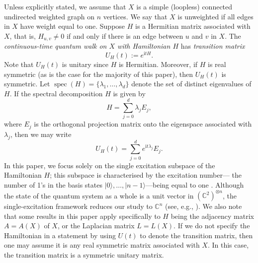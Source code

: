 \documentclass{article}
\numberwithin{equation}{section}
\def\C{\mathbb{C}}
\def\ii{\mathrm{i}}
\begin{document}
{Unless explicitly stated, we assume that $X$ is a simple (loopless) connected undirected weighted graph on $n$ vertices. We say that $X$ is unweighted if all edges in $X$ have weight equal to one. Suppose $H$ is a Hermitian matrix associated with $X$, that is, $H_{u,v}\neq 0$ if and only if there is an edge between $u$ and $v$ in $X$. The {\sl continuous-time quantum walk on $X$ with Hamiltonian $H$} has \textit{transition matrix}
\begin{equation*}
U_H(t) :=e^{\ii t H}.
\end{equation*}
Note that $U_H(t)$ is unitary since $H$ is Hermitian. Moreover, if $H$ is real symmetric (as is the case for the majority of this paper), then $U_H(t)$ is symmetric. Let $\operatorname{spec}(H)=\{\lambda_1,\ldots,\lambda_d\}$ denote the set of distinct eigenvalues of $H$.  If the spectral decomposition $H$ is given by
\begin{equation*}
H=\sum_{j=0}^d\lambda_jE_j,
\end{equation*}
where $E_j$ is the orthogonal projection matrix onto the eigenspace associated with $\lambda_j$, then we may write
\begin{equation*}
U_H(t)=\sum_{j=0}^de^{\ii t\lambda_j}E_j.
\end{equation*}
In this paper, we focus solely on the single excitation subspace of the Hamiltonian $H$; this subspace is characterised by the excitation number---
the number of 1's in the basis states $|0\rangle,  \dots, |n-1\rangle$---being equal to one \cite{keele2022combating}. Although the state of the quantum system as a whole is a unit vector in $(\C^2)^{\otimes n}$, the single-excitation framework reduces our study to $\C^n$ (see, e.g., \cite{chan2019quantum}). We also note that some results in this paper apply specifically to $H$ being the adjacency matrix $A=A(X)$ of $X$, or the Laplacian matrix $L=L(X)$. If we do not specify the Hamiltonian in a statement by using $U(t)$ to denote the
transition matrix, then one may assume it is any real symmetric matrix associated with $X$. In this case, the transition matrix is a symmetric unitary matrix.

}
\end{document}
